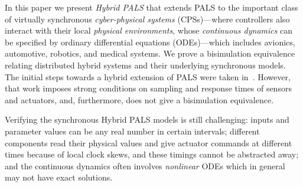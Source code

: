 In this paper
we present \emph{Hybrid PALS} that extends  PALS 
to the important class of virtually synchronous \emph{cyber-physical
  systems} (CPSs)---where controllers also interact with their local \emph{physical environments},
whose \emph{continuous dynamics} can be  specified by  ordinary
differential equations (ODEs)---which includes avionics, automotive, robotics, and medical systems. 
We prove a bisimulation equivalence relating
distributed hybrid systems and their underlying synchronous models.
%
The initial steps towards a hybrid extension of PALS were taken
in~\cite{hybrid-pals}. However, 
that work imposes strong  conditions on sampling and response times
of sensors and actuators, and, furthermore,  does not give 
a bisimulation equivalence. %





Verifying the synchronous Hybrid PALS models is still challenging:
inputs and parameter values can be any real number in certain
intervals; different components  read their physical values and give
actuator commands at  different times 
because of  local clock skews, and these timings cannot be abstracted
away; and the continuous dynamics  often involves 
\emph{nonlinear} ODEs
which in general may not have exact solutions.



